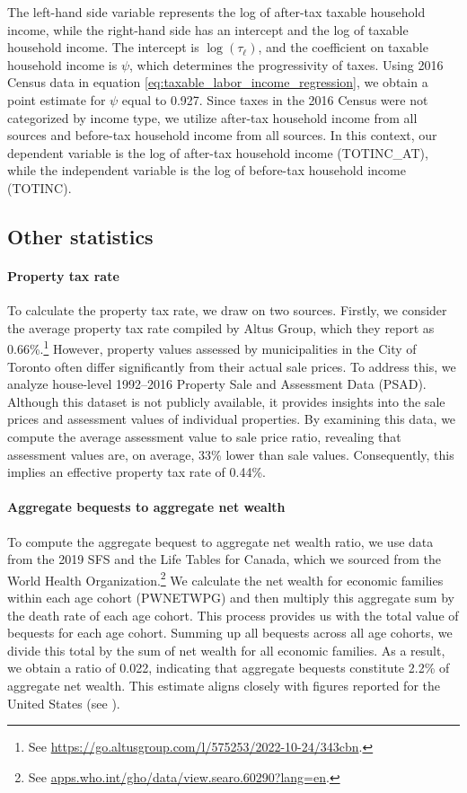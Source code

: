 \documentclass[parskip=full]{article}
\begin{document}
\noindent The left-hand side variable represents the log of after-tax taxable household income, while the right-hand side has an intercept and the log of taxable household income. The intercept is $\log(\tau_{\ell})$, and the coefficient on taxable household income is $\psi$, which determines the progressivity of taxes. Using 2016 Census data in equation \eqref{eq:taxable_labor_income_regression}, we obtain a point estimate for $\psi$ equal to 0.927. Since taxes in the 2016 Census were not categorized by income type, we utilize after-tax household income from all sources and before-tax household income from all sources. In this context, our dependent variable is the log of after-tax household income (TOTINC\_AT), while the independent variable is the log of before-tax household income (TOTINC).

\subsection{Other statistics}

\paragraph{Property tax rate}

To calculate the property tax rate, we draw on two sources. Firstly, we consider the average property tax rate compiled by Altus Group, which they report as 0.66\%.\footnote{See \url{https://go.altusgroup.com/l/575253/2022-10-24/343cbn}.} However, property values assessed by municipalities in the City of Toronto often differ significantly from their actual sale prices. To address this, we analyze house-level 1992--2016 Property Sale and Assessment Data (PSAD). Although this dataset is not publicly available, it provides insights into the sale prices and assessment values of individual properties. By examining this data, we compute the average assessment value to sale price ratio, revealing that assessment values are, on average, 33\% lower than sale values. Consequently, this implies an effective property tax rate of 0.44\%.

\paragraph{Aggregate bequests to aggregate net wealth}

To compute the aggregate bequest to aggregate net wealth ratio, we use data from the 2019 SFS and the Life Tables for Canada, which we sourced from the World Health Organization.\footnote{See \url{apps.who.int/gho/data/view.searo.60290?lang=en}.} We calculate the net wealth for economic families within each age cohort (PWNETWPG) and then multiply this aggregate sum by the death rate of each age cohort. This process provides us with the total value of bequests for each age cohort. Summing up all bequests across all age cohorts, we divide this total by the sum of net wealth for all economic families. As a result, we obtain a ratio of 0.022, indicating that aggregate bequests constitute 2.2\% of aggregate net wealth. This estimate aligns closely with figures reported for the United States (see \citet{cagetti-denardi-2006}).
\end{document}
